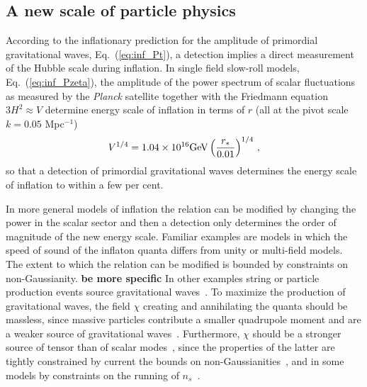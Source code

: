 \subsection{A new scale of particle physics}
\label{sec:scale-of-inflation}
According to the inflationary prediction for the amplitude of primordial gravitational waves, Eq.~(\ref{eq:inf_Pt}), a detection implies a direct measurement of the Hubble scale during inflation. In single field slow-roll models, Eq.~(\ref{eq:inf_Pzeta}), the amplitude of the power spectrum of scalar fluctuations as measured by the {\it Planck} satellite together with the Friedmann equation $3H^2\approx V$ determine energy scale of inflation in terms of $r$ (all at the pivot scale $k=0.05$ Mpc$^{-1}$)
\begin{equation}\label{eq:Vofr}
V^{1/4}=1.04\times 10^{16}{\rm GeV}\left(\frac{r_*}{0.01}\right)^{1/4}\,,
\end{equation}
so that a detection of primordial gravitational waves determines the energy scale of inflation to within a few per cent. 

In more general models of inflation the relation can be modified by changing the power in the scalar sector and then a detection only determines the order of magnitude of the new energy scale. Familiar examples are models in which the speed of sound of the inflaton quanta differs from unity or multi-field models. The extent to which the relation can be modified is bounded by constraints on non-Gaussianity. {\bf be more specific}
In other examples string or particle production events source gravitational waves~\cite{Cook:2011hg,Senatore:2011sp}. To maximize the production of gravitational waves, the field $\chi$ creating and annihilating the quanta should be massless, since massive particles contribute a smaller quadrupole moment and are a weaker source of gravitational waves~\cite{Barnaby:2012xt}. Furthermore, $\chi$ should be a stronger source of tensor than of scalar modes~\cite{Barnaby:2012xt,Ferreira:2014zia,Mirbabayi:2014jqa,Ozsoy:2014sba}, since the properties of the latter are tightly constrained by current the bounds on non-Gaussianities~\cite{Barnaby:2010vf}, and in some models by constraints on the running of $n_s$~\cite{Meerburg:2012id}. 

